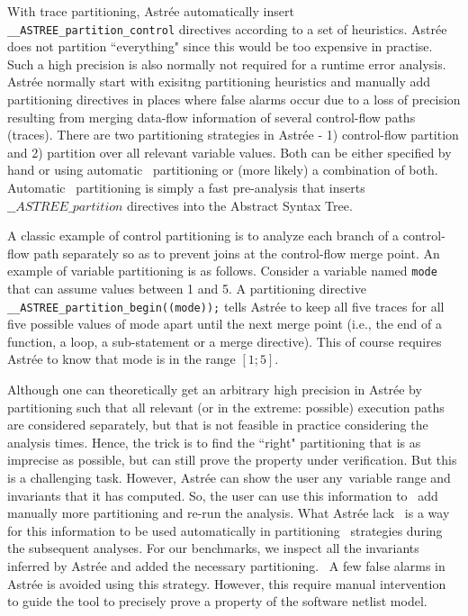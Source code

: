 With trace partitioning, Astr{\'e}e automatically insert 
\texttt{\_\_ASTREE\_partition\_control} directives according to a set of 
heuristics.  Astr{\'e}e does not partition ``everything" since this would 
be too expensive in practise. Such a high precision is also normally not 
required for a runtime error analysis. Astr{\'e}e normally start with exisitng 
partitioning heuristics and manually add partitioning directives in places 
where false alarms occur due to a loss of precision resulting from merging 
data-flow information of several control-flow paths (traces).
There are two partitioning strategies in Astr{\'e}e - 
1) control-flow partition and 2) partition over all relevant variable values.
Both can be either specified by hand or using automatic  
partitioning or (more likely) a combination of both. Automatic  
partitioning is simply a fast pre-analysis that inserts  
$\_\_ASTREE\_partition$ directives into the Abstract Syntax Tree.

A classic example of control partitioning is to analyze each branch of a 
control-flow path separately so as to prevent joins at the control-flow merge 
point.  An example of variable partitioning is as follows. Consider a variable 
named \texttt{mode} that can assume values between 1 and 5.  A partitioning directive 
\texttt{\_\_ASTREE\_partition\_begin((mode));} tells Astr{\'e}e to keep all 
five traces for all five possible values of mode apart 
until the next merge point (i.e., the end of a function, a loop, a sub-statement 
or a merge directive). This of course requires Astr{\'e}e to know that mode is 
in the range $[1;5]$.


Although one can theoretically get an arbitrary high precision in Astr{\'e}e by 
partitioning such that all relevant (or in the extreme: possible) execution 
paths are considered separately, but that is not feasible in practice considering 
the analysis times. Hence, the trick is to find the ``right" partitioning that 
is as imprecise as possible, but can still prove the property under verification. 
But this is a challenging task.  
However, Astr{\'e}e can show the user any variable range and invariants that 
it has computed.  So, the user can use this information to  
add manually more partitioning and re-run the analysis. What Astr{\'e}e lack  
is a way for this information to be used automatically in partitioning  
strategies during the subsequent analyses.  For our benchmarks, 
we inspect all the invariants inferred by Astr{\'e}e and added the 
necessary partitioning.  A few false alarms in Astr{\'e}e is avoided 
using this strategy.  However, this require manual intervention to 
guide the tool to precisely prove a property of the software netlist model.


